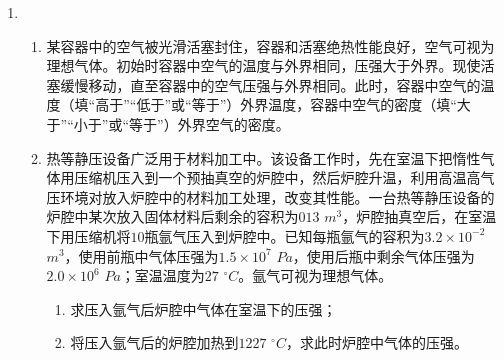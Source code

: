 \begin{enumerate}[leftmargin=0em]
\begin{enumerate}
{\begin{enumerate}
\end{enumerate}


}





\end{enumerate}



\newpage
\item 
{}
\begin{enumerate}
\renewcommand{\labelenumi}{\arabic{enumi}.}
\item
某容器中的空气被光滑活塞封住，容器和活塞绝热性能良好，空气可视为理想气体。初始时容器中空气的温度与外界相同，压强大于外界。现使活塞缓慢移动，直至容器中的空气压强与外界相同。此时，容器中空气的温度（填“高于”“低于”或“等于”）外界温度，容器中空气的密度（填“大于”“小于”或“等于”）外界空气的密度。



\item 
热等静压设备广泛用于材料加工中。该设备工作时，先在室温下把惰性气体用压缩机压入到一个预抽真空的炉腔中，然后炉腔升温，利用高温高气压环境对放入炉腔中的材料加工处理，改变其性能。一台热等静压设备的炉腔中某次放入固体材料后剩余的容积为$ 013 $ $ m^{3} $，炉腔抽真空后，在室温下用压缩机将$ 10 $瓶氩气压入到炉腔中。已知每瓶氩气的容积为$ 3.2 \times 10^{-2} $ $ m^{3} $，使用前瓶中气体压强为$ 1.5 \times 10^7 $ $ Pa $，使用后瓶中剩余气体压强为$ 2.0 \times 10^{6} $ $ Pa $；室温温度为$ 27 $ $ ^{ \circ } C $。氩气可视为理想气体。
\begin{enumerate}
\renewcommand{\labelenumi}{\arabic{enumi}.}
\item
求压入氩气后炉腔中气体在室温下的压强；
\item 
将压入氩气后的炉腔加热到$ 1227 $ $ ^{ \circ } C $，求此时炉腔中气体的压强。



\end{enumerate}





\end{enumerate}



\end{enumerate}
